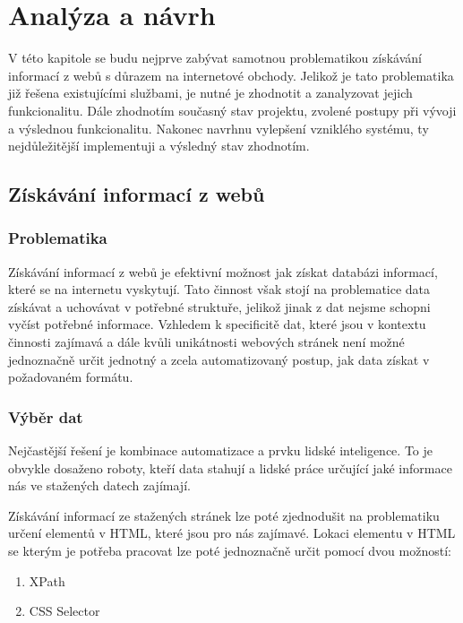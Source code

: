 \documentclass[thesis=B,czech]{FITthesis}[2012/06/26]
\begin{document}
\newpage


\chapter{Analýza a návrh}

V této kapitole se budu nejprve zabývat samotnou problematikou získávání informací 
z webů s důrazem na internetové obchody.
Jelikož je tato problematika již řešena existujícími službami, je nutné je zhodnotit a zanalyzovat jejich funkcionalitu.
Dále zhodnotím současný stav projektu, zvolené postupy při vývoji a výslednou funkcionalitu.
Nakonec navrhnu vylepšení vzniklého systému, ty nejdůležitější implementuji a výsledný stav zhodnotím.

\section{Získávání informací z webů}

\subsection{Problematika}
Získávání informací z webů je efektivní možnost jak získat databázi informací, které se na internetu vyskytují.
Tato činnost však stojí na problematice data získávat a uchovávat v potřebné struktuře, jelikož 
jinak z dat nejsme schopni vyčíst potřebné informace.
Vzhledem k specificitě dat, které jsou v kontextu činnosti zajímavá a dále kvůli unikátnosti webových stránek
není možné jednoznačně určit jednotný a zcela automatizovaný postup, jak data získat v požadovaném formátu.
\subsection{Výběr dat}
Nejčastější řešení je kombinace automatizace a prvku lidské inteligence.
To je obvykle dosaženo roboty, kteří data stahují a lidské práce určující jaké informace nás ve stažených datech zajímají.
\par
Získávání informací ze stažených stránek lze poté zjednodušit na problematiku určení elementů v HTML, které jsou pro 
nás zajímavé.
Lokaci elementu v HTML se kterým je potřeba pracovat lze poté jednoznačně určit pomocí dvou možností:
\begin{enumerate}
\item XPath
\item CSS Selector
\end{enumerate}
\end{document}
